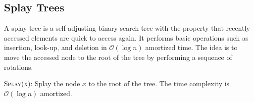 \subsection{Splay Trees}

A splay tree is a self-adjusting binary search tree with the property that recently accessed elements are quick to access again. It performs basic operations such as insertion, look-up, and deletion in \( \mathcal{O}(\log n) \) amortized time. The idea is to move the accessed node to the root of the tree by performing a sequence of rotations.

\begin{algorithm}
    \caption{\textsc{Splay(x)}: Splay the node \( x \) to the root of the tree. The time complexity is \( \mathcal{O}(\log n) \) amortized.}
    \begin{algorithmic}
            \Else{}
            \EndIf{}
        \EndWhile{}
    \end{algorithmic}
\end{algorithm}

